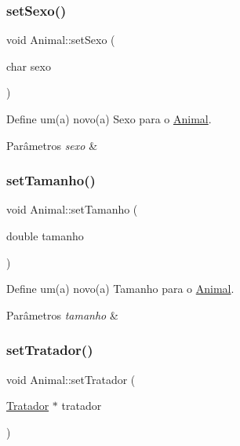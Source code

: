 \subsubsection{\texorpdfstring{set\+Sexo()}{setSexo()}}
{\footnotesize\ttfamily void Animal\+::set\+Sexo (\begin{DoxyParamCaption}\item[{char}]{sexo }\end{DoxyParamCaption})}



Define um(a) novo(a) Sexo para o \hyperlink{classAnimal}{Animal}. 


\begin{DoxyParams}{Parâmetros}
{\em sexo} & \\
\hline
\end{DoxyParams}
\mbox{\label{classAnimal_a53daf7711c6b6430c723647b2cec7c36}} 
\subsubsection{\texorpdfstring{set\+Tamanho()}{setTamanho()}}
{\footnotesize\ttfamily void Animal\+::set\+Tamanho (\begin{DoxyParamCaption}\item[{double}]{tamanho }\end{DoxyParamCaption})}



Define um(a) novo(a) Tamanho para o \hyperlink{classAnimal}{Animal}. 


\begin{DoxyParams}{Parâmetros}
{\em tamanho} & \\
\hline
\end{DoxyParams}
\mbox{\label{classAnimal_aec8cd2eec7a0c833074e303f389c8f9f}} 
\subsubsection{\texorpdfstring{set\+Tratador()}{setTratador()}}
{\footnotesize\ttfamily void Animal\+::set\+Tratador (\begin{DoxyParamCaption}\item[{\hyperlink{classTratador}{Tratador} $\ast$}]{tratador }\end{DoxyParamCaption})}



